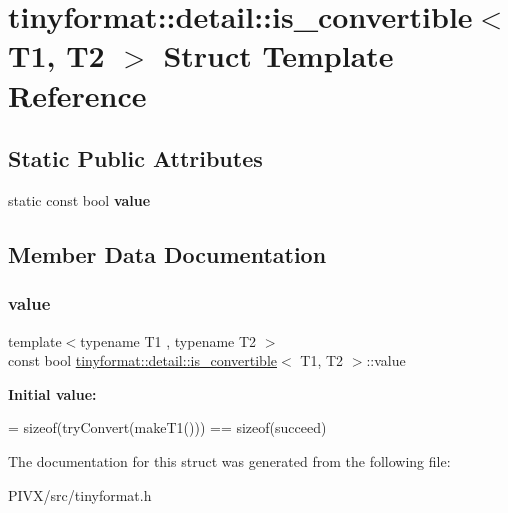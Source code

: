 \hypertarget{structtinyformat_1_1detail_1_1is__convertible}{}\section{tinyformat\+:\+:detail\+:\+:is\+\_\+convertible$<$ T1, T2 $>$ Struct Template Reference}
\label{structtinyformat_1_1detail_1_1is__convertible}
\subsection*{Static Public Attributes}
\begin{DoxyCompactItemize}
\item 
static const bool {\bfseries value}
\end{DoxyCompactItemize}


\subsection{Member Data Documentation}
\mbox{\label{structtinyformat_1_1detail_1_1is__convertible_a399ca4333bd68f88a5d5a2430f804df2}} 
\subsubsection{\texorpdfstring{value}{value}}
{\footnotesize\ttfamily template$<$typename T1 , typename T2 $>$ \\
const bool \mbox{\hyperlink{structtinyformat_1_1detail_1_1is__convertible}{tinyformat\+::detail\+::is\+\_\+convertible}}$<$ T1, T2 $>$\+::value\hspace{0.3cm}{\ttfamily [static]}}

{\bfseries Initial value\+:}
\begin{DoxyCode}
=
        \textcolor{keyword}{sizeof}(tryConvert(makeT1())) == \textcolor{keyword}{sizeof}(succeed)
\end{DoxyCode}


The documentation for this struct was generated from the following file\+:\begin{DoxyCompactItemize}
\item 
P\+I\+V\+X/src/tinyformat.\+h\end{DoxyCompactItemize}
